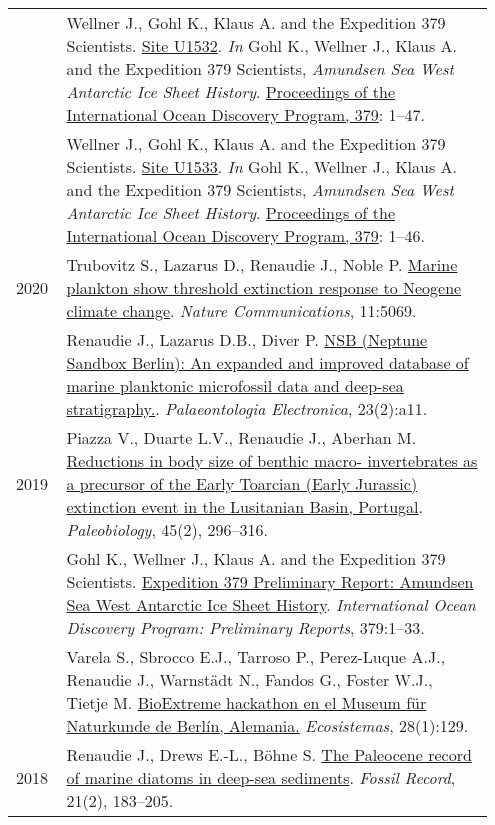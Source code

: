 \documentclass[11pt, a4paper]{article}
\makeatletter
\newcommand\fnoteref[1]{\protected@xdef\@theenmark{\ref{#1}}\@endnotemark}
\makeatother
\begin{document}
\begin{longtable}{@{}p{0.1\linewidth} >{\small}P{0.85\linewidth}@{}}
    & Wellner J., Gohl K., Klaus A. and the Expedition 379 Scientists\fnoteref{exp379scientists}. \href{https://doi.org/10.14379/iodp.proc.379.103.2021}{Site U1532}. \textit{In} Gohl K., Wellner J., Klaus A. and the Expedition 379 Scientists, \textit{Amundsen Sea West Antarctic Ice Sheet History}. \href{http://publications.iodp.org/proceedings/379/379title.html}{Proceedings of the International Ocean Discovery Program, 379}: 1--47.\\
    & Wellner J., Gohl K., Klaus A. and the Expedition 379 Scientists\fnoteref{exp379scientists}. \href{https://doi.org/10.14379/iodp.proc.379.104.2021}{Site U1533}. \textit{In} Gohl K., Wellner J., Klaus A. and the Expedition 379 Scientists, \textit{Amundsen Sea West Antarctic Ice Sheet History}. \href{http://publications.iodp.org/proceedings/379/379title.html}{Proceedings of the International Ocean Discovery Program, 379}: 1--46.\\
2020 & Trubovitz S., Lazarus D., Renaudie J., Noble P. \href{http://doi.org/10.1038/s41467-020-18879-7}{Marine plankton show threshold extinction response to Neogene climate change}. \textit{Nature Communications}, 11:5069.\\
    & Renaudie J., Lazarus D.B., Diver P. \href{https://palaeo-electronica.org/content/2020/2966-the-nsb-database}{NSB (Neptune Sandbox Berlin): An expanded and improved database of marine planktonic microfossil data and deep-sea stratigraphy.}. \textit{Palaeontologia Electronica}, 23(2):a11.\\
2019 & Piazza V., Duarte L.V., Renaudie J., Aberhan M. \href{http://doi.org/10.1017/pab.2019.11}{Reductions in body size of benthic macro- invertebrates as a precursor of the Early Toarcian (Early Jurassic) extinction event in the Lusitanian Basin, Portugal}. \textit{Paleobiology}, 45(2), 296--316.\\
    & Gohl K., Wellner J., Klaus A. and the Expedition 379 Scientists\fnoteref{exp379scientists}. \href{http://publications.iodp.org/preliminary_report/379/index.html}{Expedition 379 Preliminary Report: Amundsen Sea West Antarctic Ice Sheet History}. \textit{International Ocean Discovery Program: Preliminary Reports}, 379:1--33.\\
    & Varela S., Sbrocco E.J., Tarroso P., Perez-Luque A.J., Renaudie J., Warnst\"{a}dt N., Fandos G., Foster W.J., Tietje M. \href{http://dx.doi.org/10.7818/ECOS.1707}{BioExtreme hackathon en el Museum f\"{u}r Naturkunde de Berlín, Alemania.} \textit{Ecosistemas}, 28(1):129.\\
2018 & Renaudie J., Drews E.-L., B\"{o}hne S. \href{http://dx.doi.org/10.5194/fr-21-183-2018}{The Paleocene record of marine diatoms in deep-sea sediments}. \textit{Fossil Record}, 21(2), 183--205.\\

\end{longtable}
\end{document}
